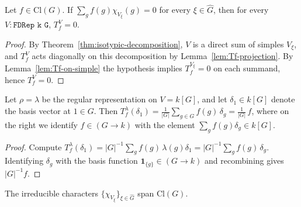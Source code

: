 \begin{lemma}[$f$ orthogonal to all $\chi_{V_\xi}$ implies $T_f^V = 0$ for every $V$]
  \label{lem:f-ortho-implies-Tf-zero}
  Let $f \in \mathrm{Cl}(G)$. If $\sum_g f(g)\chi_{V_\xi}(g) = 0$ for every
  $\xi \in \hat G$, then for every $V : \texttt{FDRep k G}$, $T_f^V = 0$.
\end{lemma}

\begin{proof}
  By Theorem~\ref{thm:isotypic-decomposition}, $V$ is a direct sum of simples
  $V_\xi$, and $T_f^V$ acts diagonally on this decomposition by
  Lemma~\ref{lem:Tf-projection}. By Lemma~\ref{lem:Tf-on-simple} the
  hypothesis implies $T_f^{V_\xi} = 0$ on each summand, hence $T_f^V = 0$.
\end{proof}

\begin{lemma}
  \label{lem:Tf-regular-delta-one}
  Let $\rho = \lambda$ be the regular representation on $V = k[G]$, and let
  $\delta_1 \in k[G]$ denote the basis vector at $1 \in G$. Then
  $T_f^\lambda(\delta_1) = \frac{1}{|G|}\sum_{g \in G} f(g)\,\delta_g
  = \frac{1}{|G|}\, f$, where on the right we identify $f \in (G \to k)$
  with the element $\sum_g f(g)\delta_g \in k[G]$.
\end{lemma}

\begin{proof}
  \leanok
  Compute $T_f^\lambda(\delta_1) = |G|^{-1}\sum_g f(g)\,\lambda(g)\delta_1
  = |G|^{-1}\sum_g f(g)\,\delta_g$. Identifying $\delta_g$ with the basis
  function $\mathbf{1}_{\{g\}} \in (G \to k)$ and recombining gives
  $|G|^{-1}f$.
\end{proof}

\begin{theorem}
  \label{thm:char-span}
  The irreducible characters $\{\chi_{V_\xi}\}_{\xi \in \hat G}$ span
  $\mathrm{Cl}(G)$.
\end{theorem}

